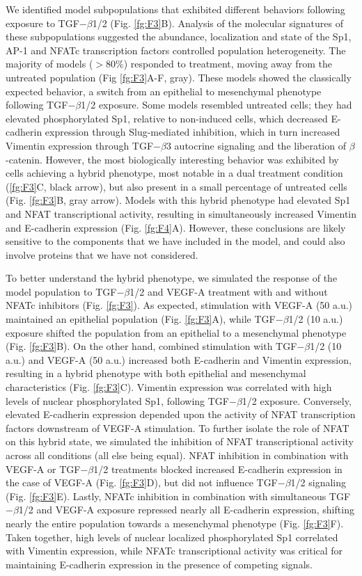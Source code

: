 \documentclass[11pt,letterpaper]{article}
\begin{document}
We identified model subpopulations that exhibited different behaviors following exposure to TGF$-\beta$1/2 (Fig. \ref{fg:F3}B).
Analysis of the molecular signatures of these subpopulations suggested the abundance, localization and state of the Sp1, AP-1 and NFATc transcription factors controlled population heterogeneity.
The majority of models ($>$80\%) responded to treatment, moving away from the untreated population (Fig \ref{fg:F3}A-F, gray).
These models showed the classically expected behavior, a switch from an epithelial to mesenchymal phenotype following TGF$-\beta$1/2 exposure.
Some models resembled untreated cells; they had elevated phosphorylated Sp1, relative to non-induced cells,
which decreased E-cadherin expression through Slug-mediated inhibition, which in turn increased Vimentin expression through TGF$-\beta$3 autocrine signaling and the liberation of $\beta$-catenin. However, the most biologically interesting behavior was exhibited by cells achieving a hybrid phenotype, most notable in a dual treatment condition (\ref{fg:F3}C, black arrow), but also present in a small percentage of untreated cells (Fig. \ref{fg:F3}B, gray arrow).
Models with this hybrid phenotype had elevated Sp1 and NFAT transcriptional activity, resulting in simultaneously increased Vimentin and E-cadherin expression (Fig. \ref{fg:F4}A).
However, these conclusions are likely sensitive to the components that we have included in the model, and could also involve proteins that we have not considered.


To better understand the hybrid phenotype, we simulated the response of the model population to TGF$-\beta$1/2 and VEGF-A treatment with and without NFATc inhibitors (Fig. \ref{fg:F3}).
As expected, stimulation with VEGF-A (50 a.u.) maintained an epithelial population (Fig. \ref{fg:F3}A), while TGF$-\beta$1/2 (10 a.u.) exposure shifted
the population from an epithelial to a mesenchymal phenotype (Fig. \ref{fg:F3}B).
On the other hand, combined stimulation with TGF$-\beta$1/2 (10 a.u.) and VEGF-A (50 a.u.) increased both E-cadherin and Vimentin expression, resulting in a hybrid phenotype with both epithelial and mesenchymal characteristics (Fig. \ref{fg:F3}C).
Vimentin expression was correlated with high levels of nuclear phosphorylated Sp1, following TGF$-\beta$1/2 exposure.
Conversely, elevated E-cadherin expression depended upon the activity of NFAT transcription factors downstream of VEGF-A stimulation.
To further isolate the role of NFAT on this hybrid state, we simulated the inhibition of NFAT transcriptional activity across all conditions (all else being equal).
NFAT inhibition in combination with VEGF-A or TGF$-\beta$1/2 treatments blocked increased E-cadherin expression in the case of VEGF-A (Fig. \ref{fg:F3}D), but did not influence TGF$-\beta$1/2 signaling (Fig. \ref{fg:F3}E).
Lastly, NFATc inhibition in combination with simultaneous TGF$-\beta$1/2 and VEGF-A exposure repressed nearly all E-cadherin expression, shifting nearly the entire population towards a mesenchymal phenotype (Fig. \ref{fg:F3}F). Taken together, high levels of nuclear localized phosphorylated Sp1 correlated with Vimentin expression,
while NFATc transcriptional activity was critical for maintaining E-cadherin expression in the presence of competing signals.
\end{document}
